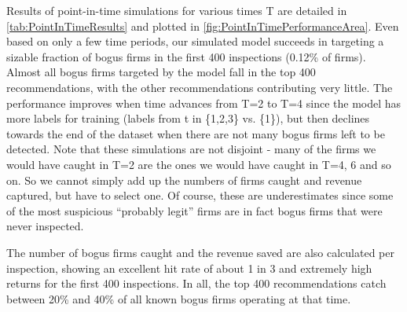 Results of point-in-time simulations for various times T are detailed in \cref{tab:PointInTimeResults} and plotted in \cref{fig:PointInTimePerformanceArea}. Even based on only a few time periods, our simulated model succeeds in targeting a sizable fraction of bogus firms in the first 400 inspections (0.12\% of firms). Almost all bogus firms targeted by the model fall in the top 400 recommendations, with the other recommendations contributing very little. The performance improves when time advances from T=2 to T=4 since the model has more labels for training (labels from t in \{1,2,3\} vs. \{1\}), but then declines towards the end of the dataset when there are not many bogus firms left to be detected. Note that these simulations are not disjoint - many of the firms we would have caught in T=2 are the ones we would have caught in T=4, 6 and so on. So we cannot simply add up the numbers of firms caught and revenue captured, but have to select one. Of course, these are underestimates since some of the most suspicious ``probably legit'' firms are in fact bogus firms that were never inspected.

The number of bogus firms caught and the revenue saved are also calculated per inspection, showing an excellent hit rate of about 1 in 3 and extremely high returns for the first 400 inspections.  In all, the top 400 recommendations catch between 20\% and 40\% of all known bogus firms operating at that time.

